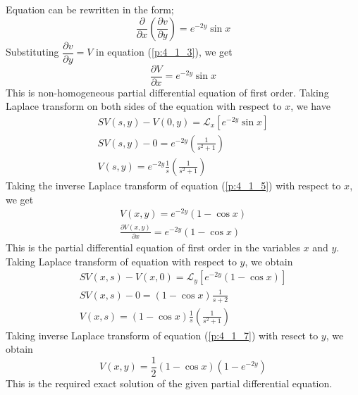 \documentclass[11pt]{report}
\newcommand{\Laplace}{\mathcal{L}}
\newcommand{\NI}{\noindent}
\newcommand{\sps}{\\[0.2cm]}
\newcommand{\dsp}{\displaystyle}
\begin{document}
	\NI Equation can be rewritten in the form;
	\begin{equation*}
		\frac{\partial}{\partial x}\left(\frac{\partial v}{\partial y}\right) = e^{-2y}\sin x \label{p:4_1_3} 
	\end{equation*}
	Substituting $\dfrac{\partial v}{\partial y} = V$ in equation (\ref{p:4_1_3}), we get
	\begin{equation*}
		\frac{\partial V}{\partial x}=e^{-2y}\sin x\label{p:4_1_4} 
	\end{equation*}
	This is non-homogeneous partial differential equation of first order. Taking Laplace transform on both sides of the equation with respect to $x$, we have
	\begin{equation*}
		\begin{array}{l}
			\dsp SV(s,y) - V(0,y) = \Laplace_x\left[e^{-2y}\sin x\right]\sps
			\dsp SV(s,y) - 0 = e^{-2y}\left(\frac{1}{s^2+1}\right)\sps
			\dsp V(s,y) = e^{-2y}\frac{1}{s}\left(\frac{1}{s^2+1}\right)
		\end{array}\label{p:4_1_5} 
	\end{equation*}
	Taking the inverse Laplace transform of equation (\ref{p:4_1_5}) with respect to $x$, we get
	\begin{equation*}
		\begin{array}{l}
			\dsp V(x,y) = e^{-2y}(1-\cos x)\sps
			\dsp\frac{\partial V(x,y)}{\partial x} = e^{-2y}(1-\cos x)
		\end{array}\label{p:4_1_6} 
	\end{equation*}
	This is the partial differential equation of first order in the variables $x$ and $y$.\\
	
	\NI Taking Laplace transform of equation  with respect to $y$, we obtain
	\begin{equation*}
		\begin{array}{l}
			\dsp SV(x,s)-V(x,0) = \Laplace_y\left[e^{-2y}(1-\cos x)\right]\sps
			\dsp SV(x,s) - 0 = (1-\cos x )\frac{1}{s+2}\sps
			\dsp V(x,s) = (1-\cos x)\frac{1}{s}\left(\frac{1}{s^2+1}\right)
		\end{array}
		\label{p:4_1_7} 
	\end{equation*}
	Taking inverse Laplace transform of equation (\ref{p:4_1_7}) with resect to $y$, we obtain
	\begin{equation*}
		V(x,y)=\frac{1}{2}(1-\cos x)(1-e^{-2y}) \label{p:4_1_8} 
	\end{equation*}
	This is the required exact solution of the given partial differential equation.
	
\end{document}
